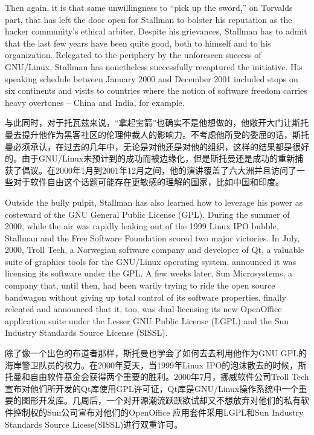 \ifdefined\eng
Then again, it is that same unwillingness to ``pick up the sword,'' on Torvalds part, that has left the door open for Stallman to bolster his reputation as the hacker community's ethical arbiter. Despite his grievances, Stallman has to admit that the last few years have been quite good, both to himself and to his organization. Relegated to the periphery by the unforeseen success of GNU/Linux, Stallman has nonetheless successfully recaptured the initiative. His speaking schedule between January 2000 and December 2001 included stops on six continents and visits to countries where the notion of software freedom carries heavy overtones -- China and India, for example.
\fi

\ifdefined\chs
与此同时，对于托瓦兹来说，``拿起宝箭''也确实不是他想做的，他敞开大门让斯托曼去提升他作为黑客社区的伦理仲裁人的影响力。不考虑他所受的委屈的话，斯托曼必须承认，在过去的几年中，无论是对他还是对他的组织，这样的结果都是很好的。由于GNU/Linux未预计到的成功而被边缘化，但是斯托曼还是成功的重新捕获了倡议。在2000年1月到2001年12月之间，他的演讲覆盖了六大洲并且访问了一些对于软件自由这个话题可能存在更敏感的理解的国家，比如中国和印度。
\fi

\ifdefined\eng
Outside the bully pulpit, Stallman has also learned how to leverage his power as costeward of the GNU General Public License (GPL). During the summer of 2000, while the air was rapidly leaking out of the 1999 Linux IPO bubble, Stallman and the Free Software Foundation scored two major victories. In July, 2000, Troll Tech, a Norwegian software company and developer of Qt, a valuable suite of graphics tools for the GNU/Linux operating system, announced it was licensing its software under the GPL. A few weeks later, Sun Microsystems, a company that, until then, had been warily trying to ride the open source bandwagon without giving up total control of its software properties, finally relented and announced that it, too, was dual licensing its new OpenOffice %
application suite under the Lesser GNU Public License (LGPL) and the Sun Industry Standards Source License (SISSL).
\fi

\ifdefined\chs
除了像一个出色的布道者那样，斯托曼也学会了如何去去利用他作为GNU GPL的海岸警卫队员的权力。在2000年夏天，当1999年Linux IPO的泡沫散去的时候，斯托曼和自由软件基金会获得两个重要的胜利。2000年7月，挪威软件公司Troll Tech宣布对他们所开发的Qt库使用GPL许可证，Qt库是GNU/Linux操作系统中一个重要的图形开发库。几周后，一个对开源潮流跃跃欲试却又不想放弃对他们的私有软件控制权的Sun公司宣布对他们的OpenOffice%
应用套件采用LGPL和Sun Industry Standards Source Licese(SISSL)进行双重许可。
\fi

